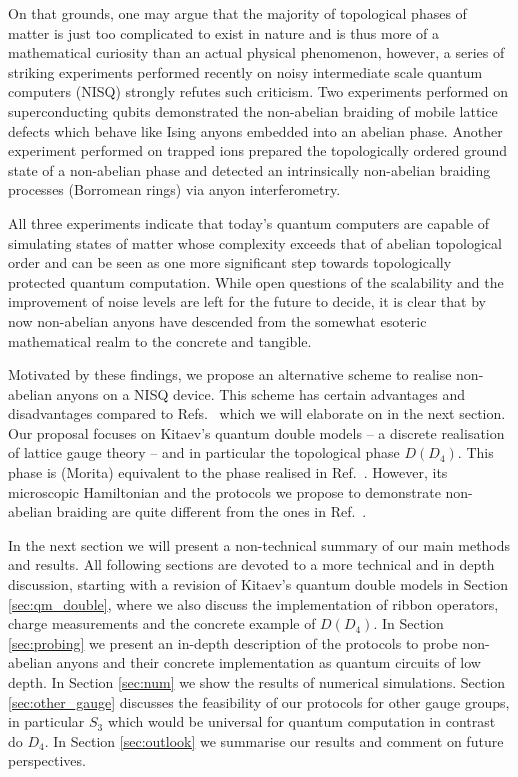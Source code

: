 \documentclass[two column]{article}
\begin{document}
On that grounds, one may argue that the majority of topological phases of matter is just too complicated to exist in nature and is thus more of a mathematical curiosity than an actual physical phenomenon, however, a series of striking experiments \cite{iqbal2023creation,xu,andersen2022observation} performed recently on noisy intermediate scale quantum computers (NISQ) strongly refutes such  criticism. Two experiments performed on superconducting qubits \cite{xu,andersen2022observation} demonstrated the non-abelian braiding of mobile lattice defects which behave like Ising anyons embedded into an abelian phase. Another experiment performed on trapped ions \cite{iqbal2023creation} prepared the topologically ordered ground state of a non-abelian phase and detected an intrinsically non-abelian braiding processes (Borromean rings) via anyon interferometry. 

All three experiments indicate that today's quantum computers are capable of simulating states of matter whose complexity exceeds that of abelian topological order and can be seen as one more significant step towards topologically protected quantum computation. While open questions of the scalability and the improvement of noise levels are left for the future to decide, it is clear that by now non-abelian anyons have descended from the somewhat esoteric mathematical realm to the concrete and tangible.

Motivated by these findings, we propose an alternative scheme to realise non-abelian anyons on a NISQ device. This scheme has certain advantages and disadvantages compared to Refs.~\cite{iqbal2023creation,xu,andersen2022observation} which we will elaborate on in the next section. Our proposal focuses on Kitaev's quantum double models -- a discrete realisation of lattice gauge theory -- and in particular the topological phase $D(D_4)$. This phase is (Morita) equivalent to the phase realised in Ref.~\cite{iqbal2023creation}. However, its microscopic Hamiltonian and the protocols we propose to demonstrate non-abelian braiding are quite different from the ones in Ref.~\cite{iqbal2023creation}. 

In the next section we will present a non-technical summary of our main methods and results. All following sections are devoted to a more technical and in depth discussion, starting with a revision of Kitaev's quantum double models in Section \ref{sec:qm_double}, where we also discuss the implementation of ribbon operators, charge measurements and the concrete example of $D(D_4)$. In Section \ref{sec:probing} we present an in-depth description of the protocols to probe non-abelian anyons and their concrete implementation as quantum circuits of low depth. In Section \ref{sec:num} we show the results of numerical simulations. Section \ref{sec:other_gauge} discusses the feasibility of our protocols for other gauge groups, in particular $S_3$ which would be universal for quantum computation in contrast do $D_4$. In Section \ref{sec:outlook} we summarise our results and comment on future perspectives.
\end{document}
